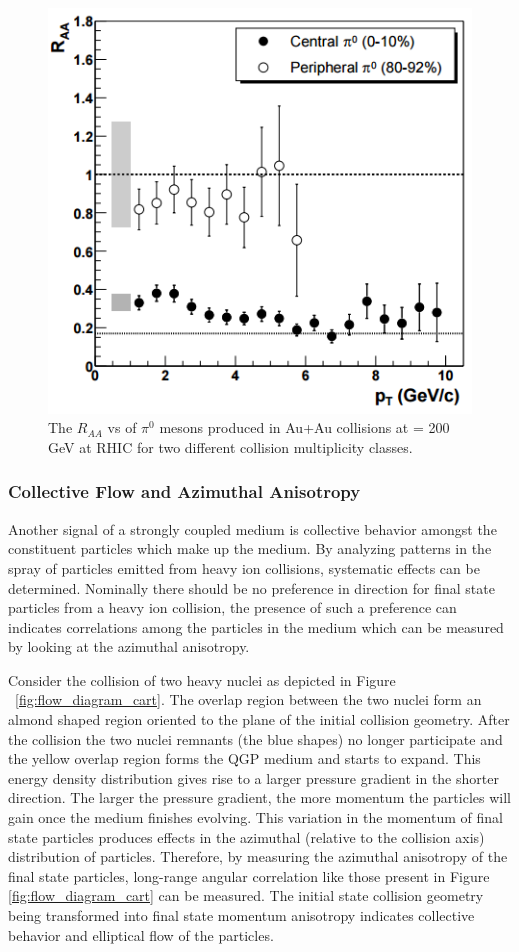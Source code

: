 \begin{figure}[!ht]
\centering
\includegraphics[width=0.6\linewidth]{figs/raa_pi0_aa_cent_periph.png}
\caption{The $R_{AA}$  vs \pt of $\pi^0$ mesons produced in Au+Au collisions at \sqsn= 200 GeV at RHIC for two different collision multiplicity classes. ~\cite{PhysRevLett.91.072303}}
\label{fig:RAA_plot}
\end{figure}
\clearpage

\subsubsection{Collective Flow and Azimuthal Anisotropy}
Another signal of a strongly coupled medium is collective behavior amongst the constituent particles which make up the medium. By analyzing patterns in the spray of particles emitted from heavy ion collisions, systematic effects can be determined. Nominally there should be no preference in direction for final state particles from a heavy ion collision, the presence of such a preference can indicates correlations among the particles in the medium which can be measured by looking at the azimuthal anisotropy.

Consider the collision of two heavy nuclei as depicted in Figure ~\ref{fig:flow_diagram_cart}. The overlap region between the two nuclei form an almond shaped region oriented to the plane of the initial collision geometry. After the collision the two nuclei remnants (the blue shapes) no longer participate and the yellow overlap region forms the QGP medium and starts to expand. This energy density distribution gives rise to a larger pressure gradient in the shorter direction. The larger the pressure gradient, the more momentum the particles will gain once the medium finishes evolving. This variation in the momentum of final state particles produces effects in the azimuthal (relative to the collision axis) distribution of particles. Therefore, by measuring the azimuthal anisotropy of the final state particles, long-range angular correlation like those present in Figure \ref{fig:flow_diagram_cart} can be measured. The initial state collision geometry being transformed into final state momentum anisotropy indicates collective behavior and elliptical flow of the particles.

